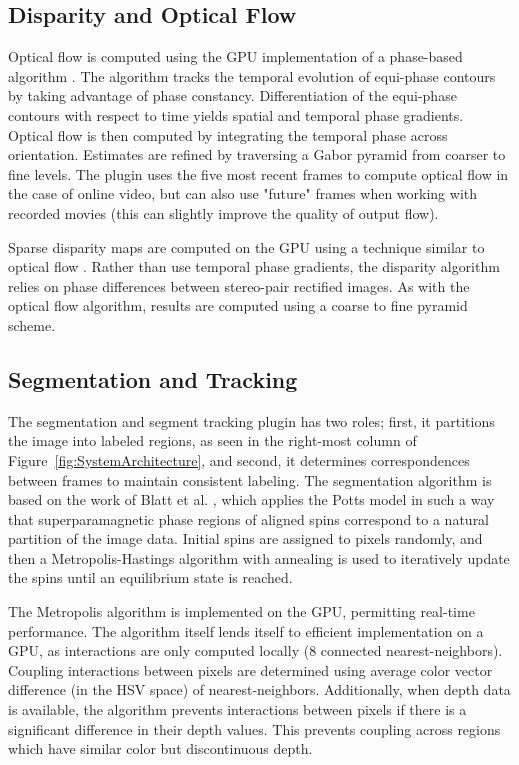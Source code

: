 \subsection{Disparity and Optical Flow}
Optical flow is computed using the GPU implementation \cite{PauwelsArchitecture} of a phase-based algorithm \cite{Gautama_OpticalFlow}. The algorithm tracks the temporal evolution of equi-phase contours by taking advantage of phase constancy. Differentiation of the equi-phase contours with respect to time yields spatial and temporal phase gradients. Optical flow is then computed by integrating the temporal phase across orientation. Estimates are refined by traversing a Gabor pyramid from coarser to fine levels. The plugin uses the five most recent frames to compute optical flow in the case of online video, but can also use "future" frames when working with recorded movies (this can slightly improve the quality of output flow). 

Sparse disparity maps are computed on the GPU using a technique similar to optical flow \cite{PauwelsArchitecture}. Rather than use temporal phase gradients, the disparity algorithm relies on phase differences between stereo-pair rectified images. As with the optical flow algorithm, results are computed using a coarse to fine pyramid scheme. 

\subsection{Segmentation and Tracking}
The segmentation and segment tracking plugin has two roles; first, it partitions the image into labeled regions, as seen in the right-most column of Figure~\ref{fig:SystemArchitecture}, and second, it determines correspondences between frames to maintain consistent labeling. The segmentation algorithm is based on the work of Blatt et al. \cite{Blatt_SuperClustering}, which applies the Potts model in such a way that superparamagnetic phase regions of aligned spins correspond to a natural partition of the image data. Initial spins are assigned to pixels randomly, and then a Metropolis-Hastings algorithm with annealing \cite{Abramov_3DSegmentation} is used to iteratively update the spins until an equilibrium state is reached. 

The Metropolis algorithm is implemented on the GPU\cite{Abramov_3DSegmentation}, permitting real-time performance. The algorithm itself lends itself to efficient implementation on a GPU, as interactions are only computed locally (8 connected nearest-neighbors). Coupling interactions between pixels are determined using average color vector difference (in the HSV space) of nearest-neighbors. Additionally, when depth data is available, the algorithm prevents interactions between pixels if there is a significant difference in their depth values. This prevents coupling across regions which have similar color but discontinuous depth. 

